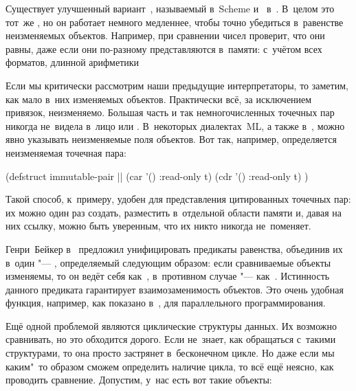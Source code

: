 Существует улучшенный вариант~, называемый  в~Scheme и~
в~{\CommonLisp}. В~целом это тот~же , но он работает немного медленнее,
чтобы точно убедиться в~равенстве неизменяемых объектов. Например, при
сравнении чисел  проверит, что они равны, даже если они по-разному
представляются в~памяти: с~учётом всех форматов, длинной арифметики {\itp}

Если мы критически рассмотрим наши предыдущие интерпретаторы, то заметим, как
мало в~них изменяемых объектов. Практически всё, за исключением привязок,
неизменяемо. Большая часть и так немногочисленных точечных пар никогда не~видела
в~лицо  или . В~некоторых диалектах~ML, а также
в~\CommonLisp, можно явно указывать неизменяемые поля объектов. Вот так,
например, определяется неизменяемая точечная пара:

\begin{code:lisp}
(defstruct immutable-pair     |\dialect{\CommonLisp}|
  (car ’() :read-only t)
  (cdr ’() :read-only t) )
\end{code:lisp}

Такой способ, к~примеру, удобен для представления цитированных точечных пар: их
можно один раз создать, разместить в~отдельной области памяти и, давая на них
ссылку, можно быть уверенным, что их никто никогда не~поменяет.

Генри~Бейкер в~\cite{bak93} предложил унифицировать предикаты равенства,
объединив их в~один "--- , определяемый следующим образом: если
сравниваемые объекты изменяемы, то он ведёт себя как~, в~противном
случае "--- как~. Истинность данного предиката гарантирует
взаимозаменимость объектов. Это очень удобная функция, например, как показано
в~\cite{qd93,que94}, для параллельного программирования.

Ещё одной проблемой являются циклические структуры данных. Их возможно
сравнивать, но это обходится дорого. Если  не~знает, как обращаться
с~такими структурами, то она просто застрянет в~бесконечном цикле. Но даже если
мы каким"~то образом сможем определить наличие цикла, то всё ещё неясно, как
проводить сравнение. Допустим, у~нас есть вот такие объекты:


